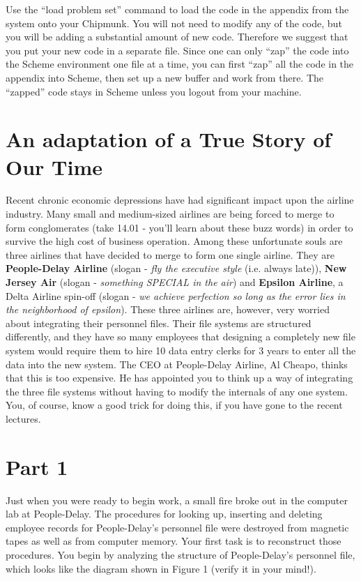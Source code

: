 Use the ``load problem set'' command to load the code in the appendix
from the system onto your Chipmunk.  You will not need to modify
any of the code, but you will be adding a substantial amount of
new code.  Therefore we suggest that you put your new code in a
separate file.  Since one can only ``zap'' the code into the Scheme
environment one file at a time, you can first ``zap'' all the code
in the appendix into Scheme, then set up a new buffer and work
from there.  The ``zapped'' code stays in Scheme unless you logout
from your machine.

\section{An adaptation of a True Story of Our Time}

Recent chronic economic depressions have had significant impact upon
the airline industry.  Many small and medium-sized airlines are being
forced to merge to form conglomerates (take 14.01 - you'll
learn about these buzz words) in order to survive the high cost of
business operation.  Among these unfortunate souls are three airlines
that have decided to merge to form one single airline.
They are {\bf People-Delay Airline} (slogan - {\it fly the executive
style}
(i.e. always late)), {\bf New Jersey Air} (slogan -  {\it something SPECIAL
in the air}) and {\bf Epsilon Airline}, a Delta Airline spin-off
(slogan - {\it we achieve perfection so long as the error lies in
the neighborhood of epsilon}).  These three airlines are, however, very worried about
integrating their personnel files.   Their file systems are structured
differently, and they have so many employees that designing a
completely
new file system would require them to hire 10 data entry clerks for
3 years to enter all the data into the new system.  The CEO at 
People-Delay Airline, Al Cheapo, thinks that this is too expensive.
He has appointed you to think up a way of integrating the three
file systems without having to modify the internals of any one
system.  You, of course, know a good trick for doing this, if you have
gone to the recent lectures.

\section{Part 1}

Just when you were ready to begin work, a small fire broke
out in the computer lab at People-Delay.  The procedures for looking
up, inserting and deleting employee records for People-Delay's
personnel file were destroyed from magnetic tapes as well as from
computer memory.  Your first task is to reconstruct those
procedures.  You begin by analyzing the
structure of People-Delay's personnel file, which looks like the diagram
shown in Figure 1 (verify it in your mind!).

